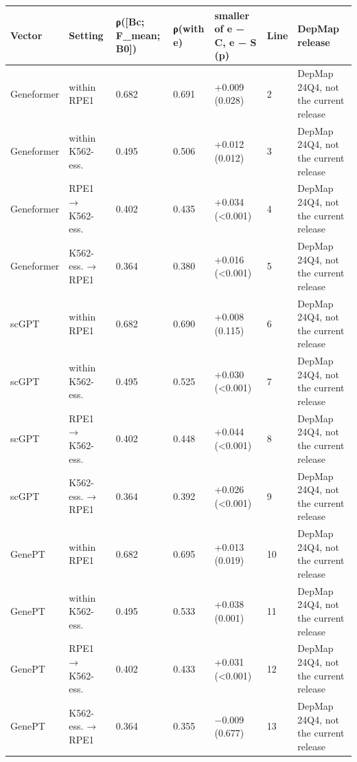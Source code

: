 \begin{tabular}{lllllll}
\toprule
Vector & Setting & ρ([Bc; F\_mean; B0]) & ρ(with e) & smaller of e − C, e − S (p) & Line & DepMap release \\
\midrule
Geneformer & within RPE1 & 0.682 & 0.691 & +0.009 (0.028) & 2 & DepMap 24Q4, not the current release \\
Geneformer & within K562-ess. & 0.495 & 0.506 & +0.012 (0.012) & 3 & DepMap 24Q4, not the current release \\
Geneformer & RPE1 → K562-ess. & 0.402 & 0.435 & +0.034 (<0.001) & 4 & DepMap 24Q4, not the current release \\
Geneformer & K562-ess. → RPE1 & 0.364 & 0.380 & +0.016 (<0.001) & 5 & DepMap 24Q4, not the current release \\
scGPT & within RPE1 & 0.682 & 0.690 & +0.008 (0.115) & 6 & DepMap 24Q4, not the current release \\
scGPT & within K562-ess. & 0.495 & 0.525 & +0.030 (<0.001) & 7 & DepMap 24Q4, not the current release \\
scGPT & RPE1 → K562-ess. & 0.402 & 0.448 & +0.044 (<0.001) & 8 & DepMap 24Q4, not the current release \\
scGPT & K562-ess. → RPE1 & 0.364 & 0.392 & +0.026 (<0.001) & 9 & DepMap 24Q4, not the current release \\
GenePT & within RPE1 & 0.682 & 0.695 & +0.013 (0.019) & 10 & DepMap 24Q4, not the current release \\
GenePT & within K562-ess. & 0.495 & 0.533 & +0.038 (0.001) & 11 & DepMap 24Q4, not the current release \\
GenePT & RPE1 → K562-ess. & 0.402 & 0.433 & +0.031 (<0.001) & 12 & DepMap 24Q4, not the current release \\
GenePT & K562-ess. → RPE1 & 0.364 & 0.355 & −0.009 (0.677) & 13 & DepMap 24Q4, not the current release \\
\bottomrule
\end{tabular}
